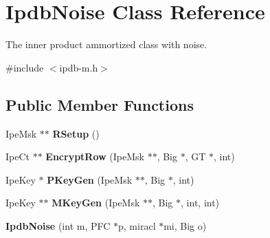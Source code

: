 \hypertarget{classIpdbNoise}{}\section{Ipdb\+Noise Class Reference}
\label{classIpdbNoise}


The inner product ammortized class with noise.  




{\ttfamily \#include $<$ipdb-\/m.\+h$>$}

\subsection*{Public Member Functions}
\begin{DoxyCompactItemize}
\item 
Ipe\+Msk $\ast$$\ast$ {\bfseries R\+Setup} ()\hypertarget{classIpdbNoise_a1bc038260c261e8ad12d89652ec330c3}{}\label{classIpdbNoise_a1bc038260c261e8ad12d89652ec330c3}

\item 
Ipe\+Ct $\ast$$\ast$ {\bfseries Encrypt\+Row} (Ipe\+Msk $\ast$$\ast$, Big $\ast$, GT $\ast$, int)\hypertarget{classIpdbNoise_aec8bd41beb6bccb721c059e2c4032fce}{}\label{classIpdbNoise_aec8bd41beb6bccb721c059e2c4032fce}

\item 
Ipe\+Key $\ast$ {\bfseries P\+Key\+Gen} (Ipe\+Msk $\ast$$\ast$, Big $\ast$, int)\hypertarget{classIpdbNoise_a38341b674887eeeee0d057fc2fa3bf72}{}\label{classIpdbNoise_a38341b674887eeeee0d057fc2fa3bf72}

\item 
Ipe\+Key $\ast$$\ast$ {\bfseries M\+Key\+Gen} (Ipe\+Msk $\ast$$\ast$, Big $\ast$, int, int)\hypertarget{classIpdbNoise_a0881cb3b4e17561e4343b4fc41609037}{}\label{classIpdbNoise_a0881cb3b4e17561e4343b4fc41609037}

\item 
{\bfseries Ipdb\+Noise} (int m, P\+FC $\ast$p, miracl $\ast$mi, Big o)\hypertarget{classIpdbNoise_a8083deed2e41b9daa310762b324276f0}{}\label{classIpdbNoise_a8083deed2e41b9daa310762b324276f0}

\end{DoxyCompactItemize}
